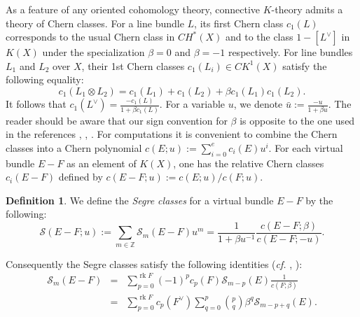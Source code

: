 \documentclass[12pt, reqno,sumlimits]{amsart}
\theoremstyle{definition}
\newtheorem{defn}[thm]{Definition}
\numberwithin{equation}{section}
\newcommand{\ee}{{e}}
\newcommand{\ZZ}{{\mathbb Z}}
\newcommand{\CH}{{C\!H}}
\newcommand{\CK}{{C\!K}}
\newcommand{\scS}{{\mathscr S}}
\newcommand{\rk}{{\operatorname{rk}}}
\begin{document}
As a feature of any oriented cohomology theory, connective $K$-theory admits a theory of Chern classes. For a line bundle $L$, its first Chern class $c_1(L)$ corresponds to the usual Chern class in $\CH^*(X)$ and to the class $1-[L^{\vee}]$ in $K(X)$ under the specialization $\beta=0$ and $\beta=-1$ respectively. For line bundles $L_1$ and $L_2$ over $X$, their 1st Chern classes $c_1(L_i)\in  \CK^1(X)$ satisfy the following equality:
\[
c_1(L_1\otimes L_2)=c_1(L_1)+c_1(L_2)+\beta c_1(L_1)c_1(L_2).
\]
It follows that $c_1(L^{\vee}) = \frac{-c_1(L)}{1+\beta c_1(L)}$. For a variable $u$, we denote $\bar u := \frac{-u}{1+\beta u}$. The reader should be aware that our sign convention for $\beta$ is opposite to the one used in the references \cite{DaiLevine}, \cite{Hudson}, \cite{LevineMorel}. 
For computations it is convenient  to combine the Chern classes into a Chern polynomial $c(E;u):=\sum_{i=0}^{\ee} c_i(E) u^i$. For each virtual bundle $E-F$ as an element of $K(X)$, one has the relative Chern classes $c_i(E-F)$ defined by $c(E-F;u):=c(E;u)/c(F;u)$.
\begin{defn} \label{defnSeg}
We define the \emph{Segre classes} for a virtual bundle $E-F$ by the following:
\begin{equation}\label{segre vir}
\scS(E-F;u):=\sum_{m\in \ZZ} \scS_{m}(E-F) u^{m}= \frac{1}{1 + \beta u^{-1}} \frac{c(E - F;\beta)}{c(E-F;-u)}.
\end{equation}
\end{defn}
Consequently the Segre classes satisfy the following identities ({\it cf.} \cite{HIMN}, \cite{HudsonMatsumura}): 
\begin{eqnarray}
\scS_m(E-F) 
&=&\sum_{p=0}^{\rk F} (-1)^p c_p(F)\scS_{m-p}(E)\frac{1}{c(F;\beta)}  \label{eqrelS1}\\
&=&\sum_{p=0}^{\rk F} c_p(F^{\vee}) \sum_{q=0}^p \binom{p}{q}\beta^q \scS_{m-p+q}(E)\label{eqrelS2}.
\end{eqnarray}
\end{document}
